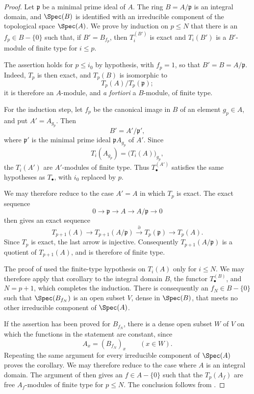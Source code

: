 \begin{proof}
Let $\mathfrak p$ be a minimal prime ideal of $A$.  The ring
$B=A/\mathfrak p$ is an integral domain, and $\Spec(B)$ is
identified with an irreducible component of the topological
space $\Spec(A)$.  We prove by induction on $p\leq N$ that
there is an $f_p\in B-\{0\}$ such that, if
$B'=B_{f_p}$, then $T_i^{(B')}$ is exact and $T_i(B')$ is a
$B'$-module of finite type for $i\leq p$.

The assertion holds for $p\leq i_0$ by hypothesis, with
$f_p=1$, so that $B'=B=A/\mathfrak p$.  Indeed, $T_p$ is then
exact, and $T_p(B)$ is isomorphic to
\[
  T_p(A)/T_p(\mathfrak p);
\]
it is therefore an $A$-module, and \emph{a fortiori} a
$B$-module, of finite type.

For the induction step, let $f_p$ be the canonical image in
$B$ of an element $g_p\in A$, and put $A'=A_{g_p}$.  Then
\[
  B'=A'/\mathfrak p',
\]
where $\mathfrak p'$ is the minimal prime ideal
$\mathfrak pA_{g_p}$ of $A'$.  Since
\[
  T_i(A_{g_p})=\bigl(T_i(A)\bigr)_{g_p},
\]
the $T_i(A')$ are $A'$-modules of finite type.  Thus
$T_\bullet^{(A')}$ satisfies the same hypotheses as
$T_\bullet$, with $i_0$ replaced by $p$.

We may therefore reduce to the case $A'=A$ in which $T_p$ is
exact.  The exact sequence
\[
  0\longrightarrow\mathfrak p
  \longrightarrow A
  \longrightarrow A/\mathfrak p
  \longrightarrow0
\]
then gives an exact sequence
\[
  T_{p+1}(A)
  \longrightarrow
  T_{p+1}(A/\mathfrak p)
  \xrightarrow{\partial}
  T_p(\mathfrak p)
  \longrightarrow
  T_p(A).
\]
Since $T_p$ is exact, the last arrow is injective.
Consequently $T_{p+1}(A/\mathfrak p)$ is a quotient of
$T_{p+1}(A)$, and is therefore of finite type.

The proof of  used the finite-type hypothesis
on $T_i(A)$ only for $i\leq N$.  We may therefore apply that
corollary to the integral domain $B$, the functor
$T_\bullet^{(B)}$, and $N=p+1$, which completes the induction.
There is consequently an $f_N\in B-\{0\}$ such that
$\Spec(B_{f_N})$ is an open subset $V$, dense in $\Spec(B)$,
that meets no other irreducible component of $\Spec(A)$.


If the assertion has been proved for $B_{f_N}$, there is a
dense open subset $W$ of $V$ on which the functions in the
statement are constant, since
\[
  A_x=(B_{f_N})_x
  \qquad(x\in W).
\]
Repeating the same argument for every irreducible component of
$\Spec(A)$ proves the corollary.  We may therefore reduce to
the case where $A$ is an integral domain.  The argument of
 then gives an $f\in A-\{0\}$ such that the
$T_p(A_f)$ are free $A_f$-modules of finite type for
$p\leq N$.  The conclusion follows from .
\end{proof}

